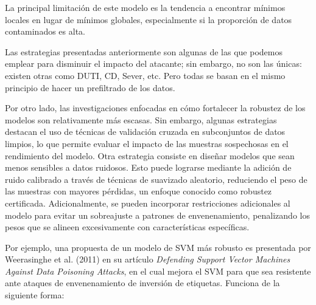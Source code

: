 \documentclass[letterpaper,12pt,oneside]{book}
\begin{document}
{{{{La principal limitación de este modelo es la tendencia a encontrar mínimos locales en lugar de mínimos globales, especialmente si la proporción de datos contaminados es alta.

Las estrategias presentadas anteriormente son algunas de las que podemos emplear para disminuir el impacto del atacante; sin embargo, no son las únicas: existen otras como DUTI, CD, Sever, etc. Pero todas se basan en el mismo principio de hacer un prefiltrado de los datos.

Por otro lado, las investigaciones enfocadas en cómo fortalecer la robustez de los modelos son relativamente más escasas. Sin embargo, algunas estrategias destacan el uso de técnicas de validación cruzada en subconjuntos de datos limpios, lo que permite evaluar el impacto de las muestras sospechosas en el rendimiento del modelo. Otra estrategia consiste en diseñar modelos que sean menos sensibles a datos ruidosos. Esto puede lograrse mediante la adición de ruido calibrado a través de técnicas de suavizado aleatorio, reduciendo el peso de las muestras con mayores pérdidas, un enfoque conocido como robustez certificada. Adicionalmente, se pueden incorporar restricciones adicionales al modelo para evitar un sobreajuste a patrones de envenenamiento, penalizando los pesos que se alineen excesivamente con características específicas.

Por ejemplo, una propuesta de un modelo de SVM más robusto es presentada por Weerasinghe et al. (2011) en su artículo \textit{Defending Support Vector Machines Against Data Poisoning Attacks}, en el cual mejora el SVM para que sea resistente ante ataques de envenenamiento de inversión de etiquetas. Funciona de la siguiente forma:

}}}}
\end{document}
